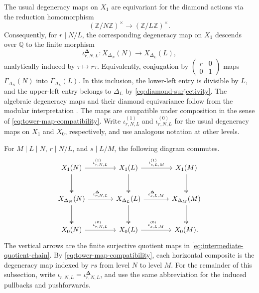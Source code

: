 \documentclass[12pt, letterpaper]{amsart}
\theoremstyle{definition}
\theoremstyle{remark}
\newcommand{\Q}{\mathbb Q}
\newcommand{\Z}{\mathbb Z}
\numberwithin{equation}{section}
\begin{document}
The usual degeneracy maps on \(X_1\) are equivariant for the diamond
actions via the reduction homomorphism
\[
        (\Z/N\Z)^\times\longrightarrow(\Z/L\Z)^\times.
\]
Consequently, for \(r\mid N/L\), the corresponding degeneracy map on \(X_1\)
descends over \(\Q\) to the finite morphism
\[
        \iota^{\boldsymbol\Delta}_{r,N,L}:X_{\Delta_N}(N)\longrightarrow
        X_{\Delta_L}(L),
\]
analytically induced by \(\tau\mapsto r\tau\).
Equivalently, conjugation by
\(\left(\begin{smallmatrix}r&0\\0&1\end{smallmatrix}\right)\) maps
\(\Gamma_{\Delta_N}(N)\) into \(\Gamma_{\Delta_L}(L)\).
In this inclusion, the lower-left entry is divisible by \(L\), and the
upper-left entry belongs to \(\Delta_L\) by
\eqref{eq:diamond-surjectivity}. The algebraic degeneracy maps and their
diamond equivariance follow from the modular interpretation
\cite{DiamondShurman}.
The maps are compatible under composition in the sense of
\eqref{eq:tower-map-compatibility}. Write
\(\iota^{(1)}_{r,N,L}\) and \(\iota^{(0)}_{r,N,L}\) for the usual degeneracy
maps on \(X_1\) and \(X_0\), respectively, and use analogous notation at other
levels.

For \(M\mid L\mid N\), \(r\mid N/L\), and \(s\mid L/M\), the following
diagram commutes.
\[
\begin{tikzcd}[column sep=large,row sep=large]
X_1(N)
  \arrow[r,"\iota^{(1)}_{r,N,L}"]
  \arrow[d,two heads]
& X_1(L)
  \arrow[r,"\iota^{(1)}_{s,L,M}"]
  \arrow[d,two heads]
& X_1(M)
  \arrow[d,two heads] \\
X_{\Delta_N}(N)
  \arrow[r,"\iota^{\boldsymbol\Delta}_{r,N,L}"]
  \arrow[d,two heads]
& X_{\Delta_L}(L)
  \arrow[r,"\iota^{\boldsymbol\Delta}_{s,L,M}"]
  \arrow[d,two heads]
& X_{\Delta_M}(M)
  \arrow[d,two heads] \\
X_0(N)
  \arrow[r,"\iota^{(0)}_{r,N,L}"]
& X_0(L)
  \arrow[r,"\iota^{(0)}_{s,L,M}"]
& X_0(M).
\end{tikzcd}
\]
The vertical arrows are the finite surjective quotient maps in
\eqref{eq:intermediate-quotient-chain}. By
\eqref{eq:tower-map-compatibility}, each horizontal composite is the
degeneracy map indexed by \(rs\) from level \(N\) to level \(M\).
For the remainder of this subsection, write
\(\iota_{r,N,L}=\iota^{\boldsymbol\Delta}_{r,N,L}\), and use the same
abbreviation for the induced pullbacks and pushforwards.
\end{document}
